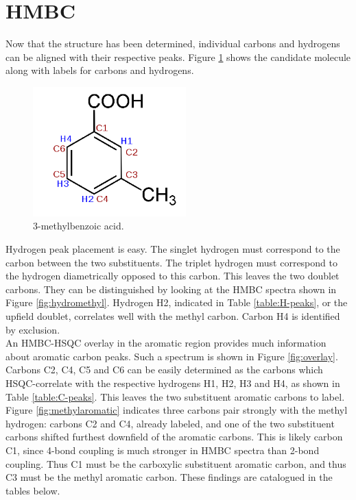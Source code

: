 \documentclass[8.5pt,twoside,twocolumn]{article}
\begin{document}
\section{HMBC}
Now that the structure has been determined, individual carbons and hydrogens can be aligned with their respective peaks. Figure \ref{fig:3MBA} shows the candidate molecule along with labels for carbons and hydrogens.\\

\begin{figure}[h]
\centering
  \includegraphics[height=5cm]{figures/molecule.png}
  \caption{3-methylbenzoic acid.}
  \label{fig:3MBA}
\end{figure}

Hydrogen peak placement is easy. The singlet hydrogen must correspond to the carbon between the two substituents. The triplet hydrogen must correspond to the hydrogen diametrically opposed to this carbon. This leaves the two doublet carbons. They can be distinguished by looking at the HMBC spectra shown in Figure \ref{fig:hydromethyl}. Hydrogen H2, indicated in Table \ref{table:H-peaks}, or the upfield doublet, correlates well with the methyl carbon. Carbon H4 is identified by exclusion.\\

An HMBC-HSQC overlay in the aromatic region provides much information about aromatic carbon peaks. Such a spectrum is shown in Figure \ref{fig:overlay}. Carbons C2, C4, C5 and C6 can be easily determined as the carbons which HSQC-correlate with the respective hydrogens H1, H2, H3 and H4, as shown in Table \ref{table:C-peaks}. This leaves the two substituent aromatic carbons to label. Figure \ref{fig:methylaromatic} indicates three carbons pair strongly with the methyl hydrogen: carbons C2 and C4, already labeled, and one of the two substituent carbons shifted furthest downfield of the aromatic carbons. This is likely carbon C1, since 4-bond coupling is much stronger in HMBC spectra than 2-bond coupling. Thus C1 must be the carboxylic substituent aromatic carbon, and thus C3 must be the methyl aromatic carbon. These findings are catalogued in the tables below.\\
\end{document}
